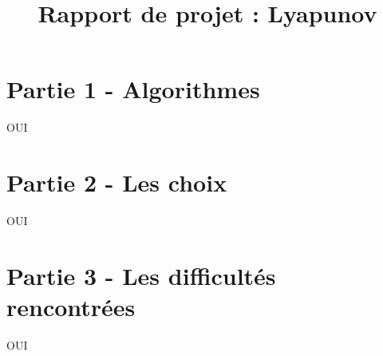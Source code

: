 \documentclass{article}
\title{Rapport de projet : Lyapunov}
\date{}
\begin{document}
    \vspace*{-2pt}
    {\let\newpage\relax\maketitle} \thispagestyle{fancy}


\section* {Partie 1 - Algorithmes}
OUI

\section* {Partie 2 - Les choix}
OUI

\section* {Partie 3 - Les difficultés rencontrées}
OUI
\end{document}
